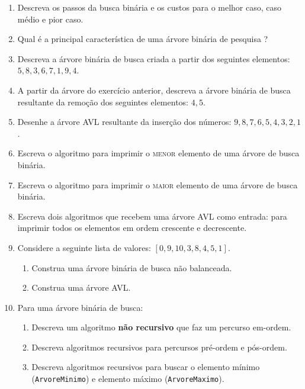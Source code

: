 \begin{enumerate}
\item Descreva os passos da busca binária e os custos para o melhor caso, caso médio
e pior caso.

\item Qual é a principal característica de uma árvore binária de pesquisa ?

\item Descreva a árvore binária de busca criada a partir dos seguintes elementos:
$5, 8, 3, 6, 7, 1, 9, 4$.

\item A partir da árvore do exercício anterior, descreva a árvore binária de busca
resultante da remoção dos seguintes elementos: $4, 5$.

\item Desenhe a árvore AVL resultante da inserção dos números: 
$9, 8, 7, 6, 5, 4, 3, 2, 1$.

\item Escreva o algoritmo para imprimir o \textsc{menor} elemento de uma árvore de busca binária.
\item Escreva o algoritmo para imprimir o \textsc{maior} elemento de uma árvore de busca binária.

\item Escreva dois algoritmos que recebem uma árvore AVL como entrada: para
imprimir todos os elementos em ordem crescente e decrescente.

\item Considere a seguinte lista de valores: $[0, 9, 10, 3, 8, 4, 5, 1]$. 
	\begin{enumerate}
	\item Construa  uma árvore binária de busca não balanceada.
	\item Construa  uma árvore AVL.
	\end{enumerate}

\item Para uma árvore binária de busca:
	\begin{enumerate}
	\item Descreva um algoritmo {\bf não recursivo} que faz um percurso em-ordem.
	\item Descreva algoritmos recursivos para percursos pré-ordem e pós-ordem.
	\item Descreva algoritmos recursivos para buscar o elemento mínimo
		(\lstinline{ArvoreMinimo}) e elemento máximo
		(\lstinline{ArvoreMaximo}).
	\end{enumerate}


\end{enumerate}
